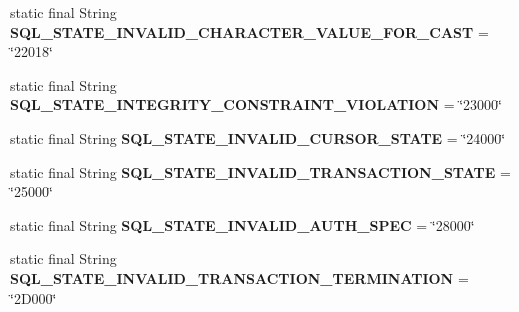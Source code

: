 \begin{DoxyCompactItemize}
\item 
\mbox{\label{classcom_1_1mysql_1_1cj_1_1exceptions_1_1_mysql_error_numbers_a84d43dc1957fb302304f6bc0ee519697}} 
static final String {\bfseries S\+Q\+L\+\_\+\+S\+T\+A\+T\+E\+\_\+\+I\+N\+V\+A\+L\+I\+D\+\_\+\+C\+H\+A\+R\+A\+C\+T\+E\+R\+\_\+\+V\+A\+L\+U\+E\+\_\+\+F\+O\+R\+\_\+\+C\+A\+ST} = \char`\"{}22018\char`\"{}
\item 
\mbox{\label{classcom_1_1mysql_1_1cj_1_1exceptions_1_1_mysql_error_numbers_aa4a8abe2947fd1a4c06e2b249e6a0630}} 
static final String {\bfseries S\+Q\+L\+\_\+\+S\+T\+A\+T\+E\+\_\+\+I\+N\+T\+E\+G\+R\+I\+T\+Y\+\_\+\+C\+O\+N\+S\+T\+R\+A\+I\+N\+T\+\_\+\+V\+I\+O\+L\+A\+T\+I\+ON} = \char`\"{}23000\char`\"{}
\item 
\mbox{\label{classcom_1_1mysql_1_1cj_1_1exceptions_1_1_mysql_error_numbers_a2a5a18cdc93f6fce35c215513c75943d}} 
static final String {\bfseries S\+Q\+L\+\_\+\+S\+T\+A\+T\+E\+\_\+\+I\+N\+V\+A\+L\+I\+D\+\_\+\+C\+U\+R\+S\+O\+R\+\_\+\+S\+T\+A\+TE} = \char`\"{}24000\char`\"{}
\item 
\mbox{\label{classcom_1_1mysql_1_1cj_1_1exceptions_1_1_mysql_error_numbers_a89083022c4ee65fad65faead1884dc8d}} 
static final String {\bfseries S\+Q\+L\+\_\+\+S\+T\+A\+T\+E\+\_\+\+I\+N\+V\+A\+L\+I\+D\+\_\+\+T\+R\+A\+N\+S\+A\+C\+T\+I\+O\+N\+\_\+\+S\+T\+A\+TE} = \char`\"{}25000\char`\"{}
\item 
\mbox{\label{classcom_1_1mysql_1_1cj_1_1exceptions_1_1_mysql_error_numbers_ab7d29a311fd6fa82a087d4b84a872f04}} 
static final String {\bfseries S\+Q\+L\+\_\+\+S\+T\+A\+T\+E\+\_\+\+I\+N\+V\+A\+L\+I\+D\+\_\+\+A\+U\+T\+H\+\_\+\+S\+P\+EC} = \char`\"{}28000\char`\"{}
\item 
\mbox{\label{classcom_1_1mysql_1_1cj_1_1exceptions_1_1_mysql_error_numbers_a7d7566a12aa6d9f895fa6d0fc7a101c5}} 
static final String {\bfseries S\+Q\+L\+\_\+\+S\+T\+A\+T\+E\+\_\+\+I\+N\+V\+A\+L\+I\+D\+\_\+\+T\+R\+A\+N\+S\+A\+C\+T\+I\+O\+N\+\_\+\+T\+E\+R\+M\+I\+N\+A\+T\+I\+ON} = \char`\"{}2\+D000\char`\"{}

\end{DoxyCompactItemize}

